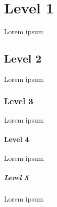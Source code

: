 \section{Level 1}
Lorem ipsum %
\subsection{Level 2}
Lorem ipsum %
\subsubsection{Level 3}
Lorem ipsum %
\paragraph{Level 4}
Lorem ipsum %
\subparagraph{Level 5}
Lorem ipsum %
